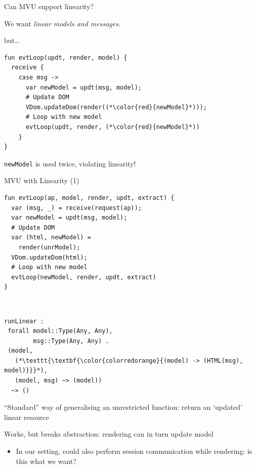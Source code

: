\documentclass[11.5pt, aspectratio=169]{beamer}
\begin{document}
\begin{frame}[fragile]{Can MVU support linearity?}

  \begin{fullpageitemize}
  \item We want \emph{linear models and messages}.
    \begin{itemize}
      \itemR but\ldots
    \end{itemize}
  \end{fullpageitemize}

  \begin{lstlisting}[language=links]
fun evtLoop(updt, render, model) {
  receive {
    case msg ->
      var newModel = updt(msg, model);
      # Update DOM
      VDom.updateDom(render((*\color{red}{newModel}*)));
      # Loop with new model
      evtLoop(updt, render, (*\color{red}{newModel}*))
    }
}
  \end{lstlisting}

  \begin{fullpageitemize}
    \item \texttt{newModel} is used twice, violating linearity!
  \end{fullpageitemize}
\end{frame}

\begin{frame}[fragile]{MVU with Linearity (1)}

\begin{minipage}{0.55\textwidth}
  \begin{lstlisting}[language=links]
fun evtLoop(ap, model, render, updt, extract) {
  var (msg, _) = receive(request(ap));
  var newModel = updt(msg, model);
  # Update DOM
  var (html, newModel) =
    render(unrModel);
  VDom.updateDom(html);
  # Loop with new model
  evtLoop(newModel, render, updt, extract)
}
  \end{lstlisting}
\end{minipage}
~
\begin{minipage}{0.42\textwidth}
  \begin{lstlisting}[numbers=none, backgroundcolor=\color{white}]
runLinear :
 forall model::Type(Any, Any),
        msg::Type(Any, Any) .
 (model,
   (*\texttt{\textbf{\color{colorredorange}{(model) -> (HTML(msg), model)}}}*),
   (model, msg) ~> (model))
  ~> ()
\end{lstlisting}
\end{minipage}

  \begin{fullpageitemize}
  \item ``Standard'' way of generalising an unrestricted function: return an `updated' linear resource
  \item Works, but breaks abstraction: rendering can in turn update model
    \begin{itemize}
      \item In our setting, could also perform session communication while rendering: is this what we want?
    \end{itemize}
  \end{fullpageitemize}
\end{frame}
\end{document}

